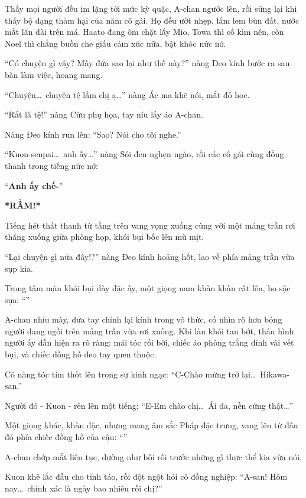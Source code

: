 \documentclass[../main.tex]{subfiles}
\begin{document}
Thấy mọi người đều im lặng tới mức kỳ quặc, A-chan ngước lên, rồi sững lại khi thấy bộ dạng thảm hại của năm cô gái. Họ đều ướt nhẹp, lấm lem bùn đất, nước mắt lăn dài trên má. Haato đang ôm chặt lấy Mio, Towa thì cố kìm nén, còn Noel thì chẳng buồn che giấu cảm xúc nữa, bật khóc nức nở.

``Có chuyện gì vậy? Mấy đứa sao lại như thế này?'' nàng Đeo kính bước ra sau bàn làm việc, hoang mang.

``Chuyện\dots\ chuyện tệ lắm chị ạ\dots'' nàng Ác ma khẽ nói, mắt đỏ hoe.

``Rất là tệ!'' nàng Cừu phụ họa, tay níu lấy áo A-chan.

Nàng Đeo kính run lên: ``Sao? Nói cho tôi nghe.''

``Kuon-senpai\dots\ anh ấy\dots'' nàng Sói đen nghẹn ngào, rồi các cô gái cùng đồng thanh trong tiếng nức nở:

``\textbf{Anh ấy chế-}''

\textbf{*RẦM!*}

Tiếng hét thất thanh từ tầng trên vang vọng xuống cùng với một mảng trần rơi thẳng xuống giữa phòng họp, khói bụi bốc lên mù mịt.

``Lại chuyện gì nữa đây!?'' nàng Đeo kính hoảng hốt, lao về phía mảng trần vừa sụp kia.

Trong tấm màn khói bụi dày đặc ấy, một giọng nam khàn khàn cất lên, ho sặc sụa: ``''

A-chan nhíu mày, đưa tay chỉnh lại kính trong vô thức, cố nhìn rõ hơn bóng người đang ngồi trên mảng trần vừa rơi xuống. Khi làn khói tan bớt, thân hình người ấy dần hiện ra rõ ràng: mái tóc rối bời, chiếc áo phông trắng dính vài vết bụi, và chiếc đồng hồ đeo tay quen thuộc.

Cô nàng tóc tím thốt lên trong sự kinh ngạc: ``C-Chào mừng trở lại\dots\ Hikawa-san.''

Người đó - Kuon - rên lên một tiếng: ``E-Em chào chị\dots\ Ái da, nền cứng thật\dots''

Một giọng khác, khàn đặc, nhưng mang âm sắc Pháp đặc trưng, vang lên từ đâu đó phía chiếc đồng hồ của cậu: ``''

A-chan chớp mắt liên tục, dường như bối rối trước những gì thực thể kia vừa nói.

Kuon khẽ lắc đầu cho tỉnh táo, rồi đột ngột hỏi cô đồng nghiệp: ``A-san! Hôm nay\dots\ chính xác là ngày bao nhiêu rồi chị?''
\end{document}
